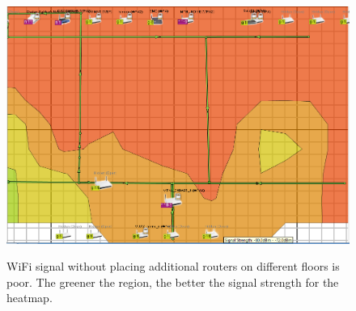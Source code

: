 \documentclass[10pt]{sensys-proc}
\begin{document}
\begin{figure}[t!]
{          \includegraphics[scale=0.085]{./figures/without_.png}}
          \hspace{1mm}
              \vspace{-3mm}
    \caption{WiFi signal without placing additional routers on different floors is poor. The greener the region, the better the signal strength for the heatmap.   
      }
\end{figure}
\end{document}
